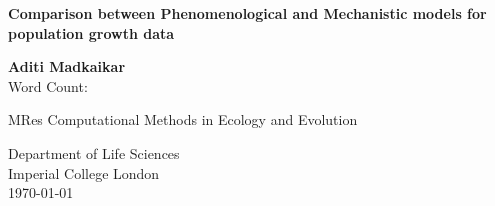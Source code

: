 \documentclass[11pt]{article}
\newcommand{\quickwordcount}[1]{%
%
}
\newcommand{\thedate}{\today}
\begin{document}
\begin{titlepage}
   \begin{center}
       \vspace*{2cm}

       \Huge
       \textbf{Comparison between Phenomenological and Mechanistic models for population growth data}
            
       \vspace{2cm}

       \Large
       \textbf{Aditi Madkaikar} \\
       Word Count: \quickwordcount{main}

       \vfill
            
       MRes Computational Methods in Ecology and Evolution\\
            
       \vspace{0.6cm}
     
       Department of Life Sciences\\
       Imperial College London\\
       \thedate \\
            
   \end{center}
\end{titlepage} 

\newpage

\begin{abstract}
Bacterial population growth studies are used as a tool in many different fields like ecology, food science, and conservation. Obtaining a growth curve is challenging as most bacteria are unculturable in laboratory conditions and even after culturing there are many problems in quantifying and model fitting. In this project, I have tried to fit different linear and non-linear models to a bacterial population growth dataset to find out which model is the best fit for the data. The entire analysis was carried out in the form of a workflow. It can be reproduced by running the script run\_miniproject.sh. The analysis was carried out in R and the report used \LaTeX. The non-linear models used and mechanistic and have an overall better fit for the regular data subsets. At the same time, the phenomenological linear models show a better fit for the poor data subsets. Overall, the mechanistic models are a better fit for growth data than the phenomenological models. 
\end{abstract}
\end{document}
